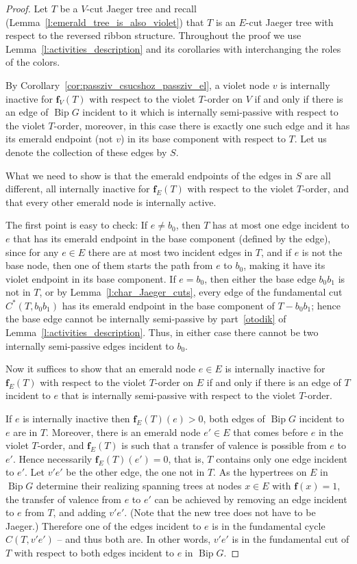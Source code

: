 \documentclass[ALCO,ThmDefs,Unicode,epreuves]{cedram}
\DeclareMathOperator{\bip}{Bip}
\begin{document}
\begin{proof}
Let $T$ be a $V$-cut Jaeger tree and recall (Lemma~\ref{l:emerald_tree_is_also_violet}) that $T$ is an $E$-cut Jaeger tree with respect to the reversed ribbon structure. Throughout the proof we use Lemma~\ref{l:activities_description} and its corollaries with interchanging the roles of the colors. 

By Corollary~\ref{cor:passziv_csucshoz_passziv_el}, a violet node $v$ is internally inactive for $\mathbf f_V(T)$ with respect to the violet $T$-order on $V$ if and only if there is an edge of $\bip G$ incident to it which is internally semi-passive with respect to the violet $T$-order, moreover, in this case there is exactly one such edge and it has its emerald endpoint (not $v$) in its base component with respect to $T$. Let us denote the collection of these edges by $S$.

What we need to show is that the emerald endpoints of the edges in $S$ are all different, all internally inactive for $\mathbf f_E(T)$ with respect to the violet $T$-order, and that every other emerald node is internally active.

The first point is easy to check: If $e\neq b_0$, then $T$ has at most one edge incident to $e$ that has its emerald endpoint in the base component (defined by the edge), since for any $e\in E$ there are at most two incident edges in $T$, and if $e$ is not the base node, then one of them starts the path from $e$ to $b_0$, making it have its violet endpoint in its base component. If $e=b_0$, then either the base edge $b_0b_1$ is not in $T$, or by Lemma~\ref{l:char_Jaeger_cuts}, every edge of the fundamental cut $C^*(T,b_0b_1)$ has its emerald endpoint in the base component of $T-b_0b_1$; hence the base edge cannot be internally semi-passive by part~\ref{otodik} of Lemma~\ref{l:activities_description}. Thus, in either case there cannot be two internally semi-passive edges incident to $b_0$.

Now it suffices to show that an emerald node $e\in E$ is internally inactive for $\mathbf f_E(T)$ with respect to the violet $T$-order on $E$ if and only if there is an edge of $T$ incident to $e$ that is internally semi-passive with respect to the violet $T$-order. 

If $e$ is internally inactive then $\mathbf f_E(T)(e)>0$, \ie both edges of $\bip G$ incident to $e$ are in $T$. Moreover, there is an emerald node $e'\in E$ that comes before $e$ in the violet $T$-order, and $\mathbf f_E(T)$ is such that a transfer of valence is possible from $e$ to $e'$. Hence necessarily $\mathbf f_E(T)(e')=0$, that is, $T$ contains only one edge incident to $e'$. Let $v'e'$ be the other edge, the one not in $T$. As the hypertrees on $E$ in $\bip G$ determine their realizing spanning trees at nodes $x\in E$ with $\mathbf f(x)=1$, the transfer of valence from $e$ to $e'$ can be achieved by removing an edge incident to $e$ from $T$, and adding $v'e'$. (Note that the new tree does not have to be Jaeger.) Therefore one of the edges incident to $e$ is in the fundamental cycle $C(T,v'e')$ -- and thus both are. In other words, $v'e'$ is in the fundamental cut of $T$ with respect to both edges incident to $e$ in $\bip G$.


\end{proof}
\end{document}
